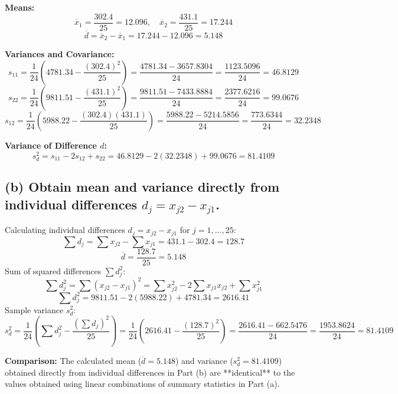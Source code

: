 \documentclass[11pt,a4paper]{article}
\begin{document}
\textbf{Means:}
\[
\overline{x}_1 = \frac{302.4}{25} = 12.096, \quad \overline{x}_2 = \frac{431.1}{25} = 17.244
\]
\[
\overline{d} = \overline{x}_2 - \overline{x}_1 = 17.244 - 12.096 = 5.148
\]

\textbf{Variances and Covariance:}
\[
s_{11} = \frac{1}{24} \left( 4781.34 - \frac{(302.4)^2}{25} \right) = \frac{4781.34 - 3657.8304}{24} = \frac{1123.5096}{24} = 46.8129
\]
\[
s_{22} = \frac{1}{24} \left( 9811.51 - \frac{(431.1)^2}{25} \right) = \frac{9811.51 - 7433.8884}{24} = \frac{2377.6216}{24} = 99.0676
\]
\[
s_{12} = \frac{1}{24} \left( 5988.22 - \frac{(302.4)(431.1)}{25} \right) = \frac{5988.22 - 5214.5856}{24} = \frac{773.6344}{24} = 32.2348
\]

\textbf{Variance of Difference $d$:}
\[
s_d^2 = s_{11} - 2s_{12} + s_{22} = 46.8129 - 2(32.2348) + 99.0676 = 81.4109
\]

\subsection*{(b) Obtain mean and variance directly from individual differences $d_j = x_{j2} - x_{j1}$.}

Calculating individual differences $d_j = x_{j2} - x_{j1}$ for $j = 1, \dots, 25$:
\[
\sum d_j = \sum x_{j2} - \sum x_{j1} = 431.1 - 302.4 = 128.7
\]
\[
\overline{d} = \frac{128.7}{25} = 5.148
\]
Sum of squared differences $\sum d_j^2$:
\[
\sum d_j^2 = \sum (x_{j2} - x_{j1})^2 = \sum x_{j2}^2 - 2\sum x_{j1}x_{j2} + \sum x_{j1}^2
\]
\[
\sum d_j^2 = 9811.51 - 2(5988.22) + 4781.34 = 2616.41
\]
Sample variance $s_d^2$:
\[
s_d^2 = \frac{1}{24} \left( \sum d_j^2 - \frac{(\sum d_j)^2}{25} \right) = \frac{1}{24} \left( 2616.41 - \frac{(128.7)^2}{25} \right) = \frac{2616.41 - 662.5476}{24} = \frac{1953.8624}{24} = 81.4109
\]

\textbf{Comparison:}
The calculated mean ($\overline{d} = 5.148$) and variance ($s_d^2 = 81.4109$) obtained directly from individual differences in Part (b) are **identical** to the values obtained using linear combinations of summary statistics in Part (a).
\end{document}
